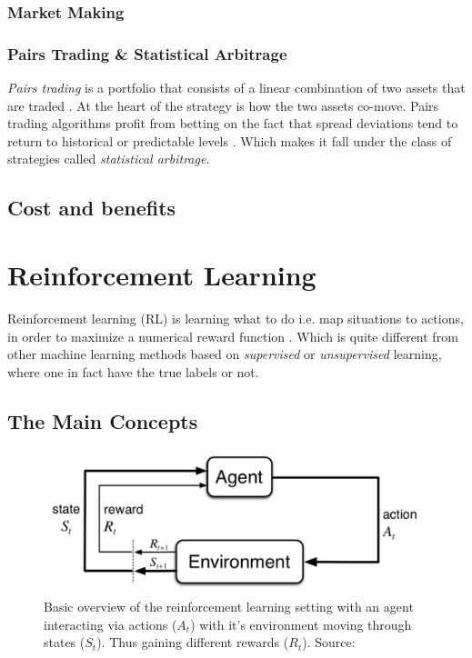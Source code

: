 \documentclass{kththesis}
\theoremstyle{definition}
\begin{document}
\subsubsection*{Market Making}

\subsubsection*{Pairs Trading \& Statistical Arbitrage}
\textit{Pairs trading} is a portfolio that consists of a linear combination of two assets that are traded \parencite{cartea2015algorithmic}. At the heart of the strategy is how the two assets co-move. Pairs trading algorithms profit from betting on the fact that spread deviations tend to return to historical or predictable levels \parencite{cartea2015algorithmic}. Which makes it fall under the class of strategies called \textit{statistical arbitrage}.

\subsection{Cost and benefits}

\section{Reinforcement Learning}
Reinforcement learning (RL) is learning what to do i.e. map situations to actions, in order to maximize a numerical reward function \parencite{sutton1998reinforcement}. Which is quite different from other machine learning methods based on \textit{supervised} or \textit{unsupervised} learning, where one in fact have the true labels or not.
\subsection{The Main Concepts}
\begin{figure}[H]
    \centering
    \includegraphics[scale=1]{basicRL.png}
    \caption{Basic overview of the reinforcement learning setting with an agent interacting via actions ($A_t$) with it's environment moving through states ($S_t$). Thus gaining different rewards ($R_t$). Source: \textcite{sutton1998reinforcement} }
    \label{fig:4}
\end{figure}
\end{document}
